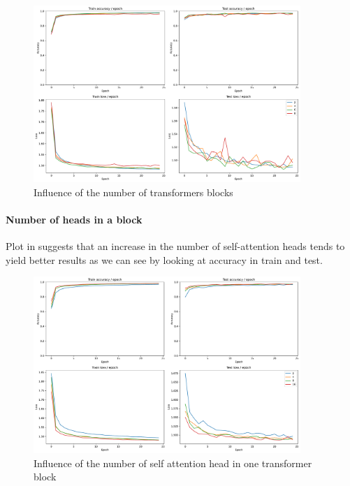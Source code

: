 \begin{figure}[H]
    \centering
    \includegraphics*[width=0.9\textwidth]{figs/Transformers/nb_block_influence_25.pdf}
    \caption{Influence of the number of transformers blocks}
    \label{fig:nb_block_influence}
\end{figure}

\paragraph{Number of heads in a block}
Plot in  suggests that an increase in the number of self-attention heads tends to yield better results as we can see by looking at accuracy in train and test.

\begin{figure}[H]
    \centering
    \includegraphics*[width=0.9\textwidth]{figs/Transformers/num_heads_influence_25.pdf}
    \caption{Influence of the number of self attention head in one transformer block }
    \label{fig:num_heads_influence}
\end{figure}

